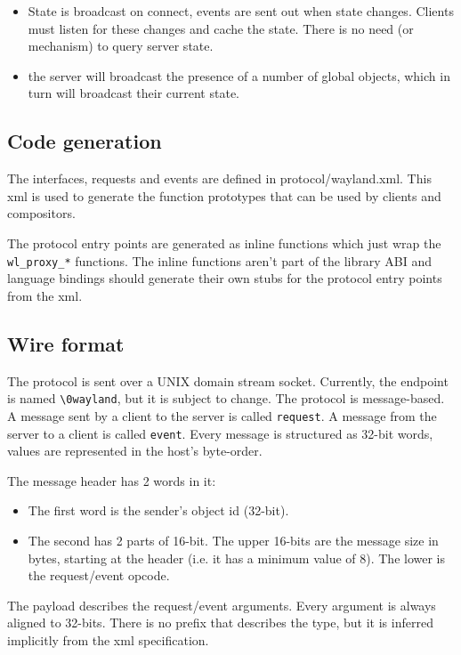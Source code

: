 \documentclass{article}
\begin{document}
\begin{itemize}
\item State is broadcast on connect, events are sent out when state
  changes. Clients must listen for these changes and cache the state.
  There is no need (or mechanism) to query server state.

\item the server will broadcast the presence of a number of global objects,
  which in turn will broadcast their current state.
\end{itemize}

\subsection{Code generation}

The interfaces, requests and events are defined in protocol/wayland.xml.
This xml is used to generate the function prototypes that can be used by
clients and compositors.

The protocol entry points are generated as inline functions which just
wrap the \verb:wl_proxy_*: functions.  The inline functions aren't
part of the library ABI and language bindings should generate their
own stubs for the protocol entry points from the xml.

\subsection{Wire format}

The protocol is sent over a UNIX domain stream socket.  Currently, the
endpoint is named \texttt{\textbackslash0wayland}, but it is subject
to change.  The protocol is message-based.  A message sent by a client
to the server is called \texttt{request}.  A message from the server
to a client is called \texttt{event}.  Every message is structured as
32-bit words, values are represented in the host's byte-order.

The message header has 2 words in it:
\begin{itemize}
\item The first word is the sender's object id (32-bit).
\item The second has 2 parts of 16-bit.  The upper 16-bits are the message
  size in bytes, starting at the header (i.e. it has a minimum value of 8).
  The lower is the request/event opcode.
\end{itemize}

The payload describes the request/event arguments.  Every argument is always
aligned to 32-bits.  There is no prefix that describes the type, but it is
inferred implicitly from the xml specification.
\end{document}
